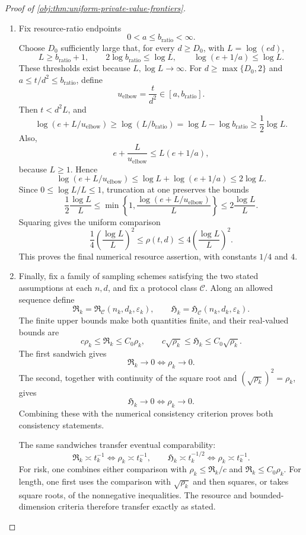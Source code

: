 \begin{proof}[Proof of \cref{obj:thm:uniform-private-value-frontiers}]
\begin{enumerate}
\item
Fix resource-ratio endpoints
\[
0<a\le b_{\mathrm{ratio}}<\infty.
\]
Choose \(D_0\) sufficiently large that, for every \(d\ge D_0\), with \(L=\log(ed)\),
\[
L\ge b_{\mathrm{ratio}}+1,\qquad
2\log b_{\mathrm{ratio}}\le\log L,\qquad
\log(e+1/a)\le\log L.
\]
These thresholds exist because \(L,\log L\to\infty\).
For \(d\ge\max\{D_0,2\}\) and \(a\le t/d^2\le b_{\mathrm{ratio}}\), define
\[
u_{\mathrm{elbow}}=\frac{t}{d^2}\in[a,b_{\mathrm{ratio}}].
\]
Then \(t<d^2L\), and
\[
\log(e+L/u_{\mathrm{elbow}})
\ge\log(L/b_{\mathrm{ratio}})
=\log L-\log b_{\mathrm{ratio}}\ge\frac12\log L.
\]
Also,
\[
e+\frac{L}{u_{\mathrm{elbow}}}
\le L(e+1/a),
\]
because \(L\ge1\). Hence
\[
\log(e+L/u_{\mathrm{elbow}})
\le\log L+\log(e+1/a)\le2\log L.
\]
Since \(0\le\log L/L\le1\), truncation at one preserves the bounds
\[
\frac12\frac{\log L}{L}
\le\min\left\{1,\frac{\log(e+L/u_{\mathrm{elbow}})}L\right\}
\le2\frac{\log L}{L}.
\]
Squaring gives the uniform comparison
\[
\frac14\left(\frac{\log L}{L}\right)^2
\le\rho(t,d)\le
4\left(\frac{\log L}{L}\right)^2.
\]
This proves the final numerical resource assertion, with constants \(1/4\) and \(4\).

\item
Finally, fix a family of sampling schemes satisfying the two stated assumptions at each \(n,d\), and fix a protocol class \(\mathcal C\).
Along an allowed sequence define
\[
\mathfrak R_k=\mathfrak R_{\mathcal C}(n_k,d_k,\varepsilon_k),
\qquad
\mathfrak H_k=\mathfrak H_{\mathcal C}(n_k,d_k,\varepsilon_k).
\]
The finite upper bounds make both quantities finite, and their real-valued bounds are
\[
c\rho_k\le\mathfrak R_k\le C_0\rho_k,
\qquad
c\sqrt{\rho_k}\le\mathfrak H_k\le C_0\sqrt{\rho_k}.
\]
The first sandwich gives
\[
\mathfrak R_k\to0\iff\rho_k\to0.
\]
The second, together with continuity of the square root and
\((\sqrt{\rho_k})^2=\rho_k\), gives
\[
\mathfrak H_k\to0\iff\rho_k\to0.
\]
Combining these with the numerical consistency criterion proves both consistency statements.

The same sandwiches transfer eventual comparability:
\[
\mathfrak R_k\asymp t_k^{-1}
\iff\rho_k\asymp t_k^{-1},
\qquad
\mathfrak H_k\asymp t_k^{-1/2}
\iff\rho_k\asymp t_k^{-1}.
\]
For risk, one combines either comparison with
\(\rho_k\le\mathfrak R_k/c\) and
\(\mathfrak R_k\le C_0\rho_k\).
For length, one first uses the comparison with \(\sqrt{\rho_k}\) and then squares, or takes square roots, of the nonnegative inequalities. The resource and bounded-dimension criteria therefore transfer exactly as stated.


\end{enumerate}
\end{proof}
